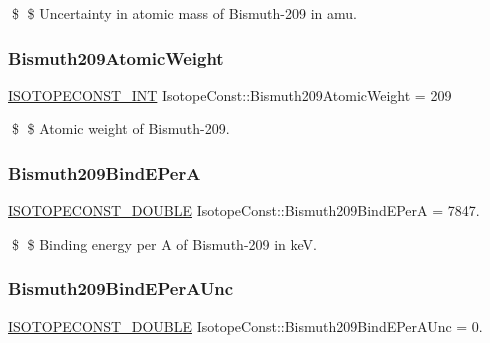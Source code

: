 \$ \$ Uncertainty in atomic mass of Bismuth-\/209 in amu. \mbox{\label{group___isotope_const-_bismuth-_bi209_gaf7d96ea2caef5ade2fa3199965810b28}} 
\subsubsection{\texorpdfstring{Bismuth209\+Atomic\+Weight}{Bismuth209AtomicWeight}}
{\footnotesize\ttfamily \mbox{\hyperlink{group___isotope_const-_macros_ga5f18360b3e99483a35c32d789e62621c}{I\+S\+O\+T\+O\+P\+E\+C\+O\+N\+S\+T\+\_\+\+I\+NT}} Isotope\+Const\+::\+Bismuth209\+Atomic\+Weight = 209}

\$ \$ Atomic weight of Bismuth-\/209. \mbox{\label{group___isotope_const-_bismuth-_bi209_gadd850add0dfb665a9e4eb5fab67fe3c2}} 
\subsubsection{\texorpdfstring{Bismuth209\+Bind\+E\+PerA}{Bismuth209BindEPerA}}
{\footnotesize\ttfamily \mbox{\hyperlink{group___isotope_const-_macros_ga8f45a7272ce02c0b4c65c44636ed719a}{I\+S\+O\+T\+O\+P\+E\+C\+O\+N\+S\+T\+\_\+\+D\+O\+U\+B\+LE}} Isotope\+Const\+::\+Bismuth209\+Bind\+E\+PerA = 7847.}

\$ \$ Binding energy per A of Bismuth-\/209 in keV. \mbox{\label{group___isotope_const-_bismuth-_bi209_ga25e41ccd098628eae3ecfa76243dfefa}} 
\subsubsection{\texorpdfstring{Bismuth209\+Bind\+E\+Per\+A\+Unc}{Bismuth209BindEPerAUnc}}
{\footnotesize\ttfamily \mbox{\hyperlink{group___isotope_const-_macros_ga8f45a7272ce02c0b4c65c44636ed719a}{I\+S\+O\+T\+O\+P\+E\+C\+O\+N\+S\+T\+\_\+\+D\+O\+U\+B\+LE}} Isotope\+Const\+::\+Bismuth209\+Bind\+E\+Per\+A\+Unc = 0.}

